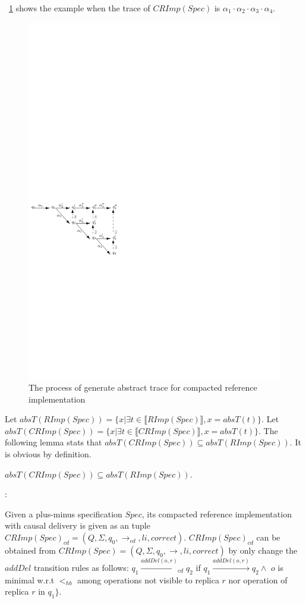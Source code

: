 \figurename~\ref{fig:the process of generate abstract trace for compacted reference implementation} shows the example when the trace of $CRImp(Spec)$ is $\alpha_1 \cdot \alpha_2 \cdot \alpha_3 \cdot \alpha_4$. 

\begin{figure}[t]
  \centering
  \includegraphics[width=0.4 \textwidth]{figures/PIC-Generate-AbstractTrace-Compact.pdf}
  \caption{The process of generate abstract trace for compacted reference implementation}
  \label{fig:the process of generate abstract trace for compacted reference implementation}
\end{figure}

Let $absT(RImp(Spec)) = \{ x \vert \exists t \in \llbracket RImp(Spec) \rrbracket, x = absT(t) \}$. Let $absT(CRImp(Spec)) = \{ x \vert \exists t \in \llbracket CRImp(Spec) \rrbracket, x = absT(t) \}$. The following lemma stats that $absT(CRImp(Spec)) \subseteq absT(RImp(Spec))$. It is obvious by definition. 

\begin{lemma}
\label{lemma:the abstract trace of CRIMPSpec is a subset of the abstract trace of RIMPSpec}
$absT(CRImp(Spec)) \subseteq absT(RImp(Spec))$.
\end{lemma}

:

Given a plus-minus specification $Spec$, its compacted reference implementation with causal delivery is given as an tuple $CRImp(Spec)_{\textit{cd}} = (Q,\Sigma,q_0,\rightarrow_{\textit{cd}},li,correct)$. $CRImp(Spec)_{\textit{cd}}$ can be obtained from $CRImp(Spec) = (Q,\Sigma,q_0,\rightarrow,li,correct)$ by only change the $addDel$  transition rules as follows: $q_1 {\xrightarrow{addDel(o,r)}}_{cd} q_2$ if $q_1 {\xrightarrow{addDel(o,r)}} q_2 \wedge $ $o$ is minimal w.r.t $<_{hb}$ among operations not visible to replica $r$ nor operation of replica $r$ in $q_1 \}$.

